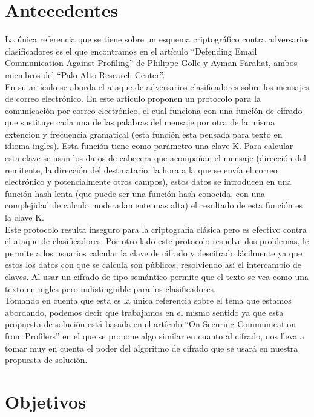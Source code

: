 \documentclass[12pt,oneside,onecolumn,openany]{report}
\begin{document}
\chapter{Antecedentes} %
La  única  referencia  que se tiene  sobre  un  esquema  criptográfico  contra  adversarios clasificadores es el que encontramos en el artículo 
“Defending Email Communication Against Profiling” de Philippe Golle  y  Ayman  Farahat, ambos  miembros del 
“Palo Alto Research Center”.\\
En su artículo se aborda el ataque de adversarios clasificadores sobre los mensajes de correo electrónico. En este articulo proponen un protocolo para la comunicación por correo electrónico, el cual funciona con una función  de cifrado que sustituye cada una de las palabras del mensaje por otra de la misma extencion y frecuencia gramatical (esta función esta pensada para texto en idioma ingles). Esta función tiene como parámetro una clave K. Para calcular esta clave se usan los datos de cabecera que acompañan el mensaje (dirección  del remitente, la dirección del destinatario, la hora a la que se envía el correo electrónico y potencialmente otros campos), estos datos se introducen en una función hash lenta (que puede ser una función hash conocida, con una complejidad de calculo moderadamente mas alta) el resultado de esta función es la clave K. \\
Este  protocolo resulta inseguro para la criptografia clásica pero es efectivo contra el ataque de clasificadores. Por otro lado este protocolo resuelve dos problemas, le  permite  a los usuarios  calcular  la  clave de cifrado y descifrado  fácilmente  ya  que  estos los datos con que se calcula son  públicos, resolviendo así el intercambio de claves. Al usar un cifrado de tipo semántico permite que el texto se vea como una texto en ingles pero indistinguible para los clasificadores. 
\\
Tomando  en  cuenta  que  esta  es  la  única  referencia  sobre el  tema  que  estamos abordando, podemos decir que trabajamos en el mismo sentido ya que esta propuesta de 
solución está  basada en el  artículo “On Securing  Communication  from Profilers”\cite{clas,Attacks} en el que  se  propone  algo  similar  en  cuanto  al  cifrado,  nos  lleva  a  tomar  muy  en  cuenta  el 
poder del algoritmo de cifrado que se usará en nuestra propuesta de solución.

\chapter{Objetivos} %
\label{cha:objetivo}
\end{document}
